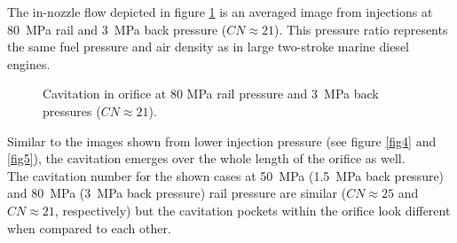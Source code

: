 \documentclass[letterpaper,twocolumn,10pt]{ilass}
\begin{document}
The in-nozzle flow depicted in figure \ref{fig6} is an averaged image from injections at
80~MPa rail and 3~MPa back pressure ($CN \approx 21$). This pressure ratio represents the
same fuel pressure and air density as in large two-stroke marine diesel engines.
%


\begin{figure}[h]
\begin{center}
\end{center}
\vspace*{-2mm}
\caption{Cavitation in orifice at 80 MPa rail pressure and 3~MPa back pressures ($CN \approx 21$).}
\label{fig6} 
\end{figure}


Similar to the images shown from lower injection pressure (see figure \ref{fig4} and \ref{fig5}),
the cavitation emerges over the whole length of the orifice as well.\\
%
The cavitation number for the shown cases at 50~MPa (1.5~MPa back pressure) and 80~MPa
(3~MPa back pressure) rail pressure are similar ($CN \approx 25$ and $CN \approx 21$,
respectively) but the cavitation pockets within the orifice look different when compared
to each other.\\
\end{document}
